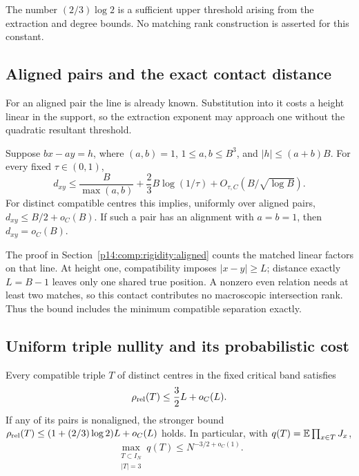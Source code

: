 The number $(2/3)\log2$ is a sufficient upper threshold
arising from the extraction and degree bounds.  No matching
rank construction is asserted for this constant.


\subsection{Aligned pairs and the exact contact distance}

For an aligned pair the line is already known.  Substitution into it
costs a height linear in the support, so the extraction exponent may
approach one without the quadratic resultant threshold.

\begin{proposition}
\label{p13:rig:aligned}
Suppose $bx-ay=h$, where $(a,b)=1$, $1\le a,b\le B^3$,
and $|h|\le(a+b)B$.  For every fixed $\tau\in(0,1)$,
\begin{equation}
 d_{xy}\le\frac B{\max(a,b)}+\frac23B\log(1/\tau)
                    +O_{\tau,C}(B/\sqrt{\log B}).
 \label{p13:rig:aligned-quantitative}
\end{equation}
For distinct compatible centres this implies, uniformly
over aligned pairs,
$d_{xy}\le B/2+o_C(B)$.  If such a pair has an alignment
with $a=b=1$, then $d_{xy}=o_C(B)$.
\end{proposition}

The proof in Section~\ref{p14:comp:rigidity:aligned} counts the matched
linear factors on that line.  At height one, compatibility imposes
$|x-y|\ge L$; distance exactly $L=B-1$ leaves only one shared true
position.  A nonzero even relation needs at least two matches, so this
contact contributes no macroscopic intersection rank.  Thus the bound
includes the minimum compatible separation exactly.

\subsection{Uniform triple nullity and its probabilistic cost}

\begin{corollary}
\label{p13:rig:triple}
Every compatible triple $T$ of distinct centres in the
fixed critical band satisfies
\begin{equation}
                 \rho_{\rm rel}(T)\le\frac32L+o_C(L).
 \label{p13:rig:triple-nullity}
\end{equation}
If any of its pairs is nonaligned, the stronger bound
$\rho_{\rm rel}(T)\le(1+(2/3)\log2)L+o_C(L)$ holds.
In particular, with $q(T)=\mathbb E\prod_{x\in T}J_x$,
\begin{equation}
                  \max_{\substack{T\subset I_N\\|T|=3}}q(T)
                            \le N^{-3/2+o_C(1)}.
 \label{p13:rig:max-triple}
\end{equation}
\end{corollary}

